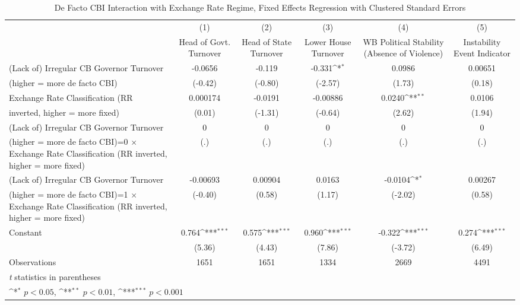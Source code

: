 \begin{table}[htbp]\centering
\def\sym#1{\ifmmode^{#1}\else\(^{#1}\)\fi}
\caption{De Facto CBI Interaction with Exchange Rate Regime, Fixed Effects Regression with Clustered Standard Errors \label{imultIndFEDF}}
\begin{tabular}{l*{5}{c}}
\toprule
                                        &\multicolumn{1}{c}{(1)}&\multicolumn{1}{c}{(2)}&\multicolumn{1}{c}{(3)}&\multicolumn{1}{c}{(4)}&\multicolumn{1}{c}{(5)}\\
                                        &\multicolumn{1}{c}{Head of Govt. Turnover}&\multicolumn{1}{c}{Head of State Turnover}&\multicolumn{1}{c}{Lower House Turnover}&\multicolumn{1}{c}{WB Political Stability (Absence of Violence)}&\multicolumn{1}{c}{Instability Event Indicator}\\
\midrule
(Lack of) Irregular CB Governor Turnover&-0.0656         &-0.119         &-0.331\sym{*}  &0.0986         &0.00651         \\
(higher = more de facto CBI)            &(-0.42)         &(-0.80)         &(-2.57)         &(1.73)         &(0.18)         \\
\addlinespace
Exchange Rate Classification (RR        &0.000174         &-0.0191         &-0.00886         &0.0240\sym{**} &0.0106         \\
inverted, higher = more fixed)          &(0.01)         &(-1.31)         &(-0.64)         &(2.62)         &(1.94)         \\
\addlinespace
(Lack of) Irregular CB Governor Turnover&    0         &    0         &    0         &    0         &    0         \\
(higher = more de facto CBI)=0 $\times$ Exchange Rate Classification (RR inverted, higher = more fixed)&  (.)         &  (.)         &  (.)         &  (.)         &  (.)         \\
\addlinespace
(Lack of) Irregular CB Governor Turnover&-0.00693         &0.00904         &0.0163         &-0.0104\sym{*}  &0.00267         \\
(higher = more de facto CBI)=1 $\times$ Exchange Rate Classification (RR inverted, higher = more fixed)&(-0.40)         &(0.58)         &(1.17)         &(-2.02)         &(0.58)         \\
\addlinespace
Constant                                &0.764\sym{***}&0.575\sym{***}&0.960\sym{***}&-0.322\sym{***}&0.274\sym{***}\\
                                        &(5.36)         &(4.43)         &(7.86)         &(-3.72)         &(6.49)         \\
\midrule
Observations                            & 1651         & 1651         & 1334         & 2669         & 4491         \\
\bottomrule
\multicolumn{6}{l}{\footnotesize \textit{t} statistics in parentheses}\\
\multicolumn{6}{l}{\footnotesize \sym{*} \(p<0.05\), \sym{**} \(p<0.01\), \sym{***} \(p<0.001\)}\\
\end{tabular}
\end{table}
